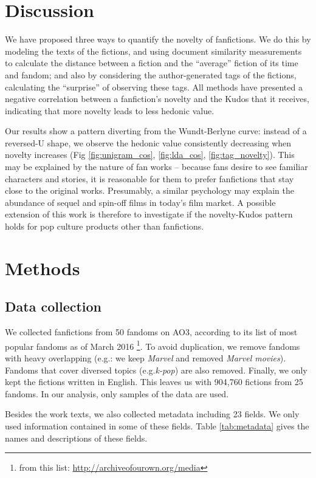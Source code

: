 \documentclass[a4paper]{article}
\begin{document}
\section*{Discussion}
We have proposed three ways to quantify the novelty of fanfictions. We do this by modeling the texts of the fictions, and using document similarity measurements to calculate the distance between a fiction and the ``average'' fiction of its time and fandom; and also by considering the author-generated tags of the fictions, calculating the ``surprise'' of observing these tags. All methods have presented a negative correlation between a fanfiction's novelty and the Kudos that it receives, indicating that more novelty leads to less hedonic value.

Our results show a pattern diverting from the Wundt-Berlyne curve: instead of a reversed-U shape, we observe the hedonic value consistently decreasing when novelty increases (Fig \ref{fig:unigram_cos}, \ref{fig:lda_cos}, \ref{fig:tag_novelty}). This may be explained by the nature of fan works -- because fans desire to see familiar characters and stories, it is reasonable for them to prefer fanfictions that stay close to the original works. Presumably, a similar psychology may explain the abundance of sequel and spin-off films in today's film market. A possible extension of this work is therefore to investigate if the novelty-Kudos pattern holds for pop culture products other than fanfictions. 


\section*{Methods}

\subsection*{Data collection}
We collected fanfictions from 50 fandoms on AO3, according to its list of most popular fandoms as of March 2016 \footnote{from this list: \url{http://archiveofourown.org/media}}. To avoid duplication, we remove fandoms with heavy overlapping (e.g.: we keep \emph{Marvel} and removed \emph{Marvel movies}). Fandoms that cover diversed topics (e.g.\emph{k-pop}) are also removed. Finally, we only kept the fictions written in English. This leaves us with 904,760 fictions from 25 fandoms. In our analysis, only samples of the data are used. 

Besides the work texts, we also collected metadata including 23 fields. We only used information contained in some of these fields. Table \ref{tab:metadata} gives the names and descriptions of these fields. 
\end{document}
